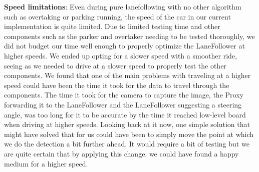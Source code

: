 \noindent
\textbf{Speed limitations}: Even during pure lanefollowing with no other
algorithm such as overtaking or parking running, the speed of the car in our
current implementation is quite limited. Due to limited testing time and other
components such as the parker and overtaker needing to be tested thoroughly, we
did not budget our time well enough to properly optimize the LaneFollower at
higher speeds. We ended up opting for a slower speed with a smoother ride,
seeing as we needed to drive at a slower speed to properly test the other
components. We found that one of the main problems with traveling at a higher
speed could have been the time it took for the data to travel through the
components. The time it took for the camera to capture the image, the Proxy
forwarding it to the LaneFollower  and the LaneFollower suggesting a steering
angle, was too long for it to be accurate by the time it reached low-level board
when driving at higher speeds. Looking back at it now, one simple solution that
might have solved that for us could have been to simply move the point at which
we do the detection a bit further ahead. It would require a bit of testing but
we are quite certain that by applying this change, we could have found a happy
medium for a higher speed.

